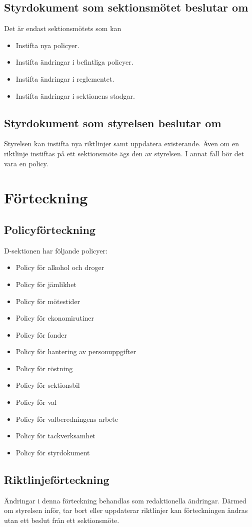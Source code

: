 \documentclass[]{dsekprotokoll}
\begin{document}
\subsection{Styrdokument som sektionsmötet beslutar om}
Det är endast sektionsmötets som kan
\begin{itemize}
    \item Instifta nya policyer.
    \item Instifta ändringar i befintliga policyer.
    \item Instifta ändringar i reglementet.
    \item Instifta ändringar i sektionens stadgar.
\end{itemize}

\subsection{Styrdokument som styrelsen beslutar om}
Styrelsen kan instifta nya riktlinjer samt uppdatera existerande. Även om en riktlinje instiftas på ett sektionsmöte ägs den av styrelsen. I annat fall bör det vara en policy.

\section{Förteckning}
\subsection{Policyförteckning}
D-sektionen har följande policyer:
\begin{itemize}
    \item Policy för alkohol och droger
    \item Policy för jämlikhet
    \item Policy för mötestider
    \item Policy för ekonomirutiner
    \item Policy för fonder
    \item Policy för hantering av personuppgifter
    \item Policy för röstning
    \item Policy för sektionsbil
    \item Policy för val
    \item Policy för valberedningens arbete
    \item Policy för tackverksamhet
    \item Policy för styrdokument
\end{itemize}
\subsection{Riktlinjeförteckning}
Ändringar i denna förteckning behandlas som redaktionella ändringar. Därmed om styrelsen inför, tar bort eller uppdaterar riktlinjer kan förteckningen ändras utan ett beslut från ett sektionsmöte.
\end{document}
